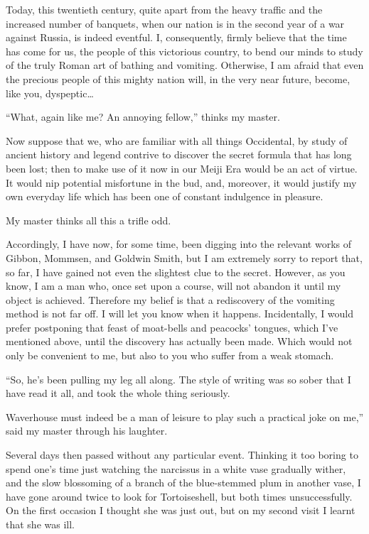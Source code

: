\documentclass{book}
\begin{document}
Today, this twentieth century, quite apart from the heavy traffic and
the increased number of banquets, when our nation is in the second year
of a war against Russia, is indeed eventful. I, consequently, firmly
believe that the time has come for us, the people of this victorious
country, to bend our minds to study of the truly Roman art of bathing
and vomiting. Otherwise, I am afraid that even the precious people of
this mighty nation will, in the very near future, become, like you,
dyspeptic\ldots{}

``What, again like me? An annoying fellow,'' thinks my master.

Now suppose that we, who are familiar with all things Occidental, by
study of ancient history and legend contrive to discover the secret
formula that has long been lost; then to make use of it now in our Meiji
Era would be an act of virtue. It would nip potential misfortune in the
bud, and, moreover, it would justify my own everyday life which has been
one of constant indulgence in pleasure.

My master thinks all this a trifle odd.

Accordingly, I have now, for some time, been digging into the relevant
works of Gibbon, Mommsen, and Goldwin Smith, but I am extremely sorry to
report that, so far, I have gained not even the slightest clue to the
secret. However, as you know, I am a man who, once set upon a course,
will not abandon it until my object is achieved. Therefore my belief is
that a rediscovery of the vomiting method is not far off. I will let you
know when it happens. Incidentally, I would prefer postponing that feast
of moat-bells and peacocks' tongues, which I've mentioned above, until
the discovery has actually been made. Which would not only be convenient
to me, but also to you who suffer from a weak stomach.

``So, he's been pulling my leg all along. The style of writing was so
sober that I have read it all, and took the whole thing seriously.

Waverhouse must indeed be a man of leisure to play such a practical joke
on me,'' said my master through his laughter.

Several days then passed without any particular event. Thinking it too
boring to spend one's time just watching the narcissus in a white vase
gradually wither, and the slow blossoming of a branch of the
blue-stemmed plum in another vase, I have gone around twice to look for
Tortoiseshell, but both times unsuccessfully. On the first occasion I
thought she was just out, but on my second visit I learnt that she was
ill.
\end{document}
